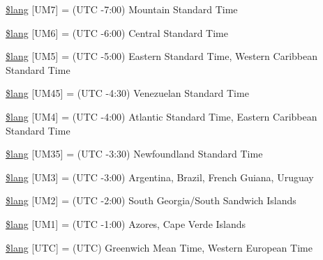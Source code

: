 \begin{DoxyCompactItemize}
\mbox{\hyperlink{date__lang_8php_adc8b3c824a6ed1d151c5f7ebd9ba1f5e}{\$lang}} \mbox{[}\textquotesingle{}U\+M7\textquotesingle{}\mbox{]} = \textquotesingle{}(U\+TC -\/7\+:00) Mountain Standard Time\textquotesingle{}
\item 
\mbox{\hyperlink{date__lang_8php_a50ab6de250eb45dd4071f052cf0ae1a6}{\$lang}} \mbox{[}\textquotesingle{}U\+M6\textquotesingle{}\mbox{]} = \textquotesingle{}(U\+TC -\/6\+:00) Central Standard Time\textquotesingle{}
\item 
\mbox{\hyperlink{date__lang_8php_acbdc94a553563f39fad3f2bc2dc85a77}{\$lang}} \mbox{[}\textquotesingle{}U\+M5\textquotesingle{}\mbox{]} = \textquotesingle{}(U\+TC -\/5\+:00) Eastern Standard Time, Western Caribbean Standard Time\textquotesingle{}
\item 
\mbox{\hyperlink{date__lang_8php_afa94a50b79072afd4e9ffcc5d44c308b}{\$lang}} \mbox{[}\textquotesingle{}U\+M45\textquotesingle{}\mbox{]} = \textquotesingle{}(U\+TC -\/4\+:30) Venezuelan Standard Time\textquotesingle{}
\item 
\mbox{\hyperlink{date__lang_8php_a40c0c7104b23705928856cce36ad3d3e}{\$lang}} \mbox{[}\textquotesingle{}U\+M4\textquotesingle{}\mbox{]} = \textquotesingle{}(U\+TC -\/4\+:00) Atlantic Standard Time, Eastern Caribbean Standard Time\textquotesingle{}
\item 
\mbox{\hyperlink{date__lang_8php_a360e08a692bcd469432096fdc362a9f9}{\$lang}} \mbox{[}\textquotesingle{}U\+M35\textquotesingle{}\mbox{]} = \textquotesingle{}(U\+TC -\/3\+:30) Newfoundland Standard Time\textquotesingle{}
\item 
\mbox{\hyperlink{date__lang_8php_af645b58e0860667b9cbc94b119b70405}{\$lang}} \mbox{[}\textquotesingle{}U\+M3\textquotesingle{}\mbox{]} = \textquotesingle{}(U\+TC -\/3\+:00) Argentina, Brazil, French Guiana, Uruguay\textquotesingle{}
\item 
\mbox{\hyperlink{date__lang_8php_ad911b59b076919d78c7c84a4b1223802}{\$lang}} \mbox{[}\textquotesingle{}U\+M2\textquotesingle{}\mbox{]} = \textquotesingle{}(U\+TC -\/2\+:00) South Georgia/South Sandwich Islands\textquotesingle{}
\item 
\mbox{\hyperlink{date__lang_8php_aa24fd948facfe7a9a6c33cb242420b27}{\$lang}} \mbox{[}\textquotesingle{}U\+M1\textquotesingle{}\mbox{]} = \textquotesingle{}(U\+TC -\/1\+:00) Azores, Cape Verde Islands\textquotesingle{}
\item 
\mbox{\hyperlink{date__lang_8php_a4f054f87e50e828424dbfcaa33c5a8df}{\$lang}} \mbox{[}\textquotesingle{}U\+TC\textquotesingle{}\mbox{]} = \textquotesingle{}(U\+TC) Greenwich Mean Time, Western European Time\textquotesingle{}

\end{DoxyCompactItemize}
